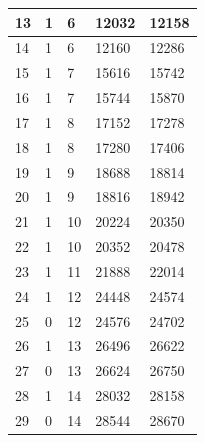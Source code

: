 \documentclass{article}
\begin{document}
\begin{table}[H]
\begin{center}
\begin{tabular}{| p{1cm} | p{1.75cm} | p{1.75cm} | p{1.75cm} | p{1.75cm} |}
                        \hline
                        13 & 1 & 6 & 12032 & 12158 \\ 
                        \hline
                        14 & 1 & 6 & 12160 & 12286 \\ 
                        \hline
                        15 & 1 & 7 & 15616 & 15742 \\ 
                        \hline
                        16 & 1 & 7 & 15744 & 15870 \\ 
                        \hline
                        17 & 1 & 8 & 17152 & 17278 \\ 
                        \hline
                        18 & 1 & 8 & 17280 & 17406 \\ 
                        \hline
                        19 & 1 & 9 & 18688 & 18814 \\ 
                        \hline
                        20 & 1 & 9 & 18816 & 18942 \\ 
                        \hline
                        21 & 1 & 10 & 20224 & 20350 \\ 
                        \hline
                        22 & 1 & 10 & 20352 & 20478 \\ 
                        \hline
                        23 & 1 & 11 & 21888 & 22014 \\ 
                        \hline
                        24 & 1 & 12 & 24448 & 24574 \\ 
                        \hline
                        25 & 0 & 12 & 24576 & 24702 \\ 
                        \hline
                        26 & 1 & 13 & 26496 & 26622 \\ 
                        \hline
                        27 & 0 & 13 & 26624 & 26750 \\ 
                        \hline
                        28 & 1 & 14 & 28032 & 28158 \\ 
                        \hline
                        29 & 0 & 14 & 28544 & 28670 \\ 
                        \hline
                    \end{tabular}
                \end{center}
            \end{table}
\end{document}
